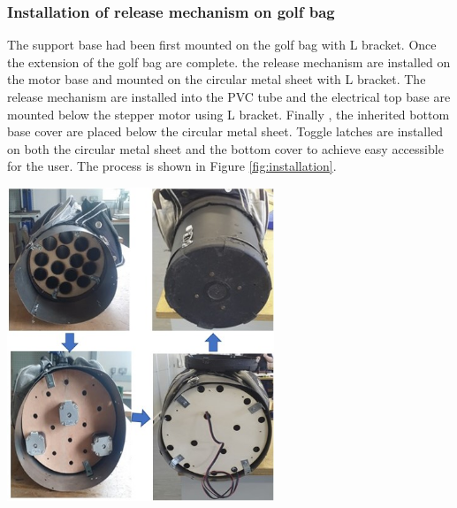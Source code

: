 \documentclass[11pt,landscape]{article}
\newenvironment{Figure}
  {\par\medskip\noindent\minipage{\linewidth}}
  {\endminipage\par\medskip}
\begin{document}
\begin{multicols}{3}
    \subsubsection{Installation of release mechanism on golf bag }
    The support base had been first mounted on the golf bag with L bracket. Once
    the extension of the golf bag are complete. the release mechanism are
    installed on the motor base and mounted on the circular metal sheet with L
    bracket. The release mechanism are installed into the PVC tube and the
    electrical top base are mounted below the stepper motor using L bracket.
    Finally , the inherited bottom base cover are placed below the circular
    metal sheet. Toggle latches are installed on both the circular metal sheet
    and the bottom cover to achieve easy accessible for the user. The process is
    shown in Figure \ref{fig:installation}.
    \begin{Figure}
        \begin{center}
            \includegraphics[width=0.6\textwidth]{Figure30.jpg}
            \label{fig:installation}
        \end{center}
    \end{Figure}
\end{multicols}
\end{document}
